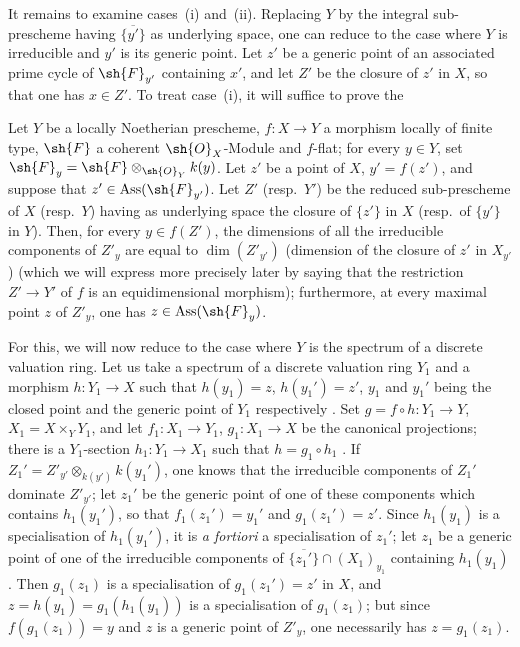 \begin{env}[12.1.1.4]
\label{IV.12.1.1.4}
It remains to examine cases~(i) and~(ii).
Replacing $Y$ by the integral sub-prescheme having $\overline{\{y'\}}$ as underlying space, one can reduce to the case where $Y$ is irreducible and $y'$ is its generic point. Let $z'$ be a generic point of an associated prime cycle of $\sh{F}_{y'}$
containing $x'$, and let $Z'$ be the closure of $z'$ in $X$, so that one has $x\in Z'$.
To treat case~(i), it will suffice to prove the

\begin{proposition}[12.1.1.5]
\label{IV.12.1.1.5}
Let $Y$ be a locally Noetherian prescheme, $f:X\to Y$ a morphism locally of finite type, $\sh{F}$ a coherent $\sh{O}_X$-Module and $f$-flat; for every $y\in Y$, set $\sh{F}_y=\sh{F}\otimes_{\sh{O}_Y}k(y)$.
Let $z'$ be a point of $X$, $y'=f(z')$, and suppose that $z'\in\operatorname{Ass}(\sh{F}_{y'})$.
Let $Z'$ \textnormal{(}resp.\ $Y'$\textnormal{)} be the reduced sub-prescheme of $X$ \textnormal{(}resp.\ $Y$\textnormal{)} having as underlying space the closure of $\{z'\}$ in $X$ \textnormal{(}resp.\ of $\{y'\}$ in $Y$\textnormal{)}.
Then, for every $y\in f(Z')$, the dimensions of all the irreducible components of $Z'_y$ are equal to $\dim(Z'_{y'})$ \textnormal{(}dimension of the closure of $z'$ in $X_{y'}$\textnormal{)} \textnormal{(}which we will express more precisely later  by saying that the restriction $Z'\to Y'$ of $f$ is an equidimensional morphism\textnormal{)}; furthermore, at every maximal point $z$ of $Z'_y$, one has $z\in\operatorname{Ass}(\sh{F}_y)$.
\end{proposition}

For this, we will now reduce to the case where $Y$ is the spectrum of a discrete valuation ring.
Let us take a spectrum of a discrete valuation ring $Y_1$ and a morphism $h:Y_1\to X$ such that $h(y_1)=z$, $h(y_1')=z'$, $y_1$ and $y_1'$ being the closed point and the generic point of $Y_1$ respectively .
Set $g=f\circ h:Y_1\to Y$, $X_1=X\times_Y Y_1$, and let $f_1:X_1\to Y_1$, $g_1:X_1\to X$ be the canonical projections; there is a $Y_1$-section $h_1:Y_1\to X_1$ such that $h=g_1\circ h_1$ .
If $Z_1'=Z'_{y'}\otimes_{k(y')}k(y_1')$, one knows  that the irreducible components of $Z_1'$ dominate $Z'_{y'}$; let $z_1'$ be the generic point of one of these components which contains $h_1(y_1')$, so that $f_1(z_1')=y_1'$ and $g_1(z_1')=z'$.
Since $h_1(y_1)$ is a specialisation of $h_1(y_1')$, it is \emph{a fortiori} a specialisation of $z_1'$; let $z_1$ be a generic point of one of the irreducible components of $\overline{\{z_1'\}}\cap(X_1)_{y_1}$ containing $h_1(y_1)$.
Then $g_1(z_1)$ is a specialisation of $g_1(z_1')=z'$ in $X$, and $z=h(y_1)=g_1(h_1(y_1))$ is a specialisation of $g_1(z_1)$; but since $f(g_1(z_1))=y$ and $z$ is a generic point of $Z'_y$, one necessarily has $z=g_1(z_1)$.


\end{env}
